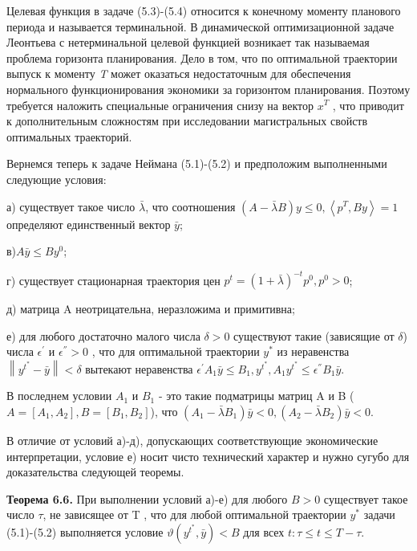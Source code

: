 \documentclass[12pt, 4paper]{book}
\begin{document}
{Целевая функция в задаче (5.3)-(5.4) относится к конечному моменту планового периода и называется терминальной. В динамической оптимизационной задаче Леонтьева с нетерминальной целевой функцией возникает так называемая проблема горизонта планирования. Дело в том, что по оптимальной траектории выпуск к моменту \textit{T} может оказаться недостаточным для обеспечения нормального функционирования экономики за горизонтом планирования. Поэтому требуется наложить специальные ограничения снизу на вектор $x^T$ , что приводит к дополнительным сложностям при исследовании магистральных свойств оптимальных траекторий.
\par

Вернемся теперь к задаче Неймана (5.1)-(5.2) и предположим выполненными следующие условия:
\par

а) существует такое число $\bar{\lambda}$, что соотношения $(A-\bar{\lambda}B)y \leq 0, \left\langle p^T,By\right\rangle = 1$ определяют единственный вектор $\bar{y}$;
\par

в)$ A\bar{y} \leq B y^0$;
\par

г) существует стационарная траектория цен $p^t = (1+ \bar{\lambda})^{-t}p^0, p^0 > 0$;
\par

д) матрица A неотрицательна, неразложима и примитивна;
\par

е) для любого достаточно малого числа $\delta >0$ существуют такие (зависящие от $\delta$) числа $\epsilon^{'} $ и $\epsilon^{''}>0$ , что для оптимальной траектории $y^{*}$ из неравенства $\left\|y^{t^{*}}-\bar{y} \right\|< \delta$ вытекают неравенства $\epsilon^{'}A_1 \bar{y} \leq B_1,y^{t^{*}}, A_1 y^{t^{*}} \leq \epsilon^{''}B_1 \bar{y}$.
\par

В последнем условии $A_1$ и $B_1$ - это такие подматрицы матриц A и B ($A=[A_1,A_2], B=[B_1,B_2]$), что $(A_1-\bar{\lambda}B_1)\bar{y}<0 ,(A_2-\bar{\lambda}B_2)\bar{y}<0$.
\par

В отличие от условий а)-д), допускающих соответствующие экономические интерпретации, условие е) носит чисто технический характер и нужно сугубо для доказательства следующей теоремы.
\par

\textbf{Теорема 6.6.} При выполнении условий а)-е) для любого $B>0$ существует такое число $\tau$, не зависящее от T , что для любой оптимальной траектории $y^{*}$ задачи (5.1)-(5.2) выполняется условие $\vartheta (y^{t^{*}},\bar{y})< B$ для всех $t:\tau \leq t \leq T - \tau$.
\par

}
\end{document}
